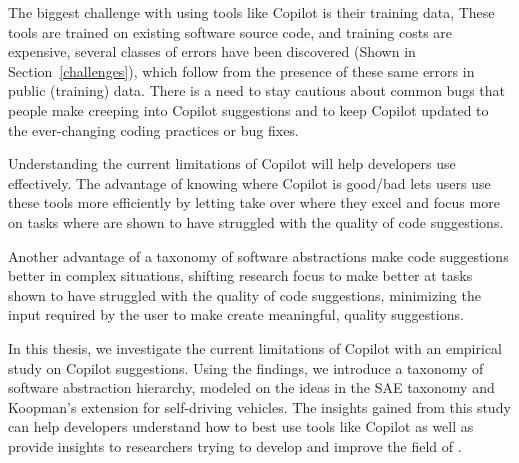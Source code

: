 The biggest challenge with using tools like Copilot is their training data, These tools are trained on existing software source code, and training costs are expensive, several classes of errors have been discovered (Shown in Section~\ref{challenges}), which follow from the presence of these same errors in public (training) data. There is a need to stay cautious about common bugs that people make creeping into Copilot suggestions and to keep Copilot updated to the ever-changing coding practices or bug fixes.

Understanding the current limitations of Copilot will help developers use \cct{} effectively. The advantage of knowing where Copilot is good/bad lets users use these tools more efficiently by letting \cct{} take over where they excel and focus more on tasks where \cct{} are shown to have struggled with the quality of code suggestions.

Another advantage of a taxonomy of software abstractions make code suggestions better in complex situations, shifting research focus to make \cct{} better at tasks shown to have struggled with the quality of code suggestions, minimizing the input required by the user to make \cct{} create meaningful, quality suggestions.

In this thesis, we investigate the current limitations of Copilot with an empirical study on Copilot suggestions. Using the findings, we introduce a taxonomy of software abstraction hierarchy, modeled on the ideas in the SAE taxonomy and Koopman's extension for self-driving vehicles. The insights gained from this study can help developers understand how to best use tools like Copilot as well as provide insights to researchers trying to develop and improve the field of \cct{}.




